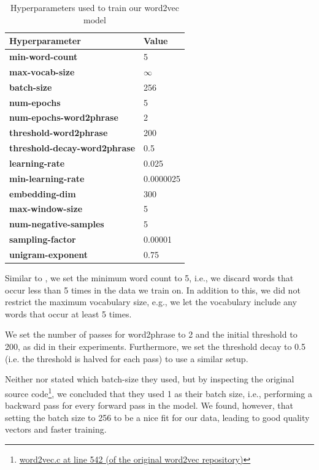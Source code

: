 \begin{table}[ht]
    \centering
    \begin{tabular}{@{}ll@{}}
    \toprule
    Hyperparameter & Value\\
    \midrule
    \trcolor \textbf{min-word-count} & 5\\
    \textbf{max-vocab-size} & $\infty$ \\
    \trcolor \textbf{batch-size} & 256\\
    \textbf{num-epochs} & 5\\
    \trcolor \textbf{num-epochs-word2phrase} & 2\\
    \textbf{threshold-word2phrase} & 200\\
    \trcolor \textbf{threshold-decay-word2phrase} & 0.5\\
    \textbf{learning-rate} & 0.025\\
    \trcolor \textbf{min-learning-rate} & 0.0000025\\
    \textbf{embedding-dim} & 300\\
    \trcolor \textbf{max-window-size} & 5\\
    \textbf{num-negative-samples} & 5\\
    \trcolor \textbf{sampling-factor} & 0.00001\\
    \textbf{unigram-exponent} & 0.75\\
    \bottomrule
    \end{tabular}
    \caption{Hyperparameters used to train our word2vec model}
    \label{table:word2vec-hyperparameter-choices}
\end{table}

Similar to \cite{mikolov2013b}, we set the minimum word count to 5, i.e., we discard words that occur less than 5 times in the data we train on. In addition to this, we did not restrict the maximum vocabulary size, e.g., we let the vocabulary include any words that occur at least 5 times.

We set the number of passes for word2phrase to 2 and the initial threshold to 200, as \cite{mikolov2013b} did in their experiments. Furthermore, we set the threshold decay to 0.5 (i.e. the threshold is halved for each pass) to use a similar setup.

Neither \cite{mikolov2013a} nor \cite{mikolov2013b} stated which batch-size they used, but by inspecting the original source code\footnote{\href{https://github.com/tmikolov/word2vec/blob/e092540633572b883e25b367938b0cca2cf3c0e7/word2vec.c/\#L542}{word2vec.c at line 542 (of the original word2vec repository)}}, we concluded that they used 1 as their batch size, i.e., performing a backward pass for every forward pass in the model. We found, however, that setting the batch size to 256 to be a nice fit for our data, leading to good quality vectors and faster training.

